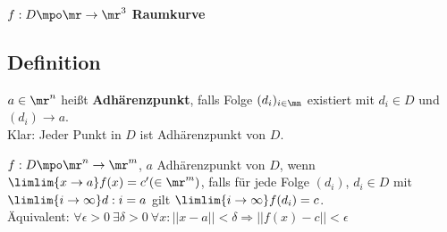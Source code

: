 		$ f:D\mpo\mr\rightarrow\mr^3 $ \textbf{Raumkurve}
	\subExEnd

\subsection{Definition}
		\item $ a\in\mr^n $ heißt \textbf{Adhärenzpunkt}, falls Folge $ (d_i)_{i\in\mn} $ existiert mit $ d_i\in D $ und $ (d_i)\rightarrow a $.\\
		Klar: Jeder Punkt in $ D $ ist Adhärenzpunkt von $ D $.
		
		\item $ f:D\mpo\mr^n\rightarrow\mr^m $, $ a $ Adhärenzpunkt von $ D $, wenn $ \limlim{x\rightarrow a}f(x)=c'(\in\mr^m) $, falls für jede Folge $ (d_i) $, $ d_i\in D $ mit $ \limlim{i\rightarrow\infty}d:i=a $ gilt $ \limlim{i\rightarrow\infty}f(d_i)=c $.\\
		Äquivalent: $ \forall\epsilon >0\ \exists\delta>0\ \forall x:||x-a||<\delta\Rightarrow||f(x)-c||<\epsilon $
	\subExEnd